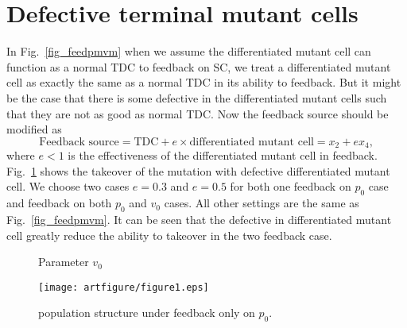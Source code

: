\documentclass[12pt]{article}
\begin{document}
\section*{Defective terminal mutant cells}
In Fig.~\ref{fig_feedpmvm} when we assume the differentiated 
mutant cell can function as a normal TDC to feedback on SC, 
we treat a differentiated mutant cell as exactly the same
as a normal TDC in its ability to feedback. But it might be
the case that there is some defective in the differentiated 
mutant cells such that they are not as good as normal TDC.
Now the feedback source should be modified as
$$
\text{Feedback source} = \text{TDC} + 
e\times \text{differentiated mutant cell}
= x_2 + e x_4,
$$
where $e<1$ is the effectiveness of the differentiated mutant
cell in feedback.
Fig.~\ref{afig_defect} shows the takeover of the mutation with 
defective differentiated mutant cell. 
We choose two cases $e=0.3$ and $e=0.5$ for both one 
feedback on $p_0$ case and feedback on both $p_0$ and $v_0$
cases. All other settings are the same as Fig.~\ref{fig_feedpmvm}.
It can be seen that the defective in differentiated mutant cell
greatly reduce the ability to takeover in the two feedback case.

\begin{figure}
\centering
{}
\caption{Parameter $v_0$}
\label{afig_defect}
\end{figure}


\begin{figure}
\centering
\texttt{[image: artfigure/figure1.eps]}
\caption{population structure under feedback only on $p_0$.}
\label{fig_feedback}
\end{figure}
\end{document}
